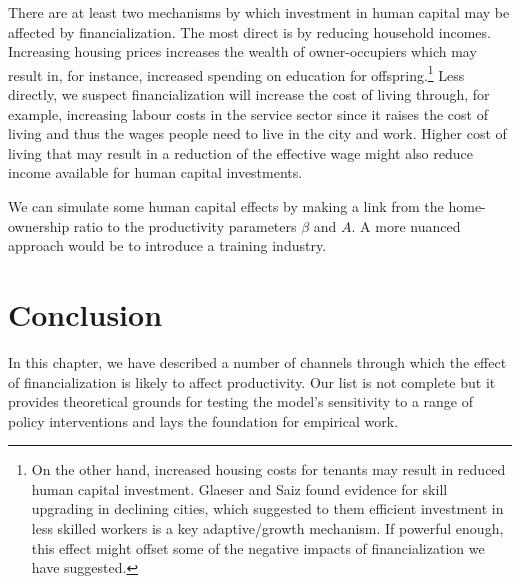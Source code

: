 There are at least two mechanisms by which investment in human capital may be affected by financialization. The most direct is by reducing household incomes. Increasing housing prices increases the wealth of owner-occupiers which may result in, for instance, increased spending on education for offspring.\footnote{On the other hand, increased housing costs for tenants may result in reduced human capital investment. Glaeser and Saiz found evidence for skill upgrading in declining cities, which suggested to them efficient investment in less skilled workers is a key adaptive/growth mechanism. If powerful enough, this effect might offset some of the negative impacts of financialization we have suggested.} %
Less directly, we suspect financialization will increase the cost of living through, for example, increasing labour costs in the service sector since it raises the cost of living and thus the wages people need to live in the city and work. Higher cost of living that may result in a reduction of the effective wage might also reduce income available for human capital investments. %

We can simulate some human capital effects by making a link from the home-ownership ratio to the productivity parameters  $\beta$ and $A$. A more nuanced approach would be to introduce a training industry. %

\section{Conclusion}
In this chapter, we have described a number of channels through which the effect of financialization is likely to affect productivity. %
Our list is not complete but it provides theoretical grounds for testing the model's sensitivity to a range of policy interventions and lays the foundation for empirical work.  

